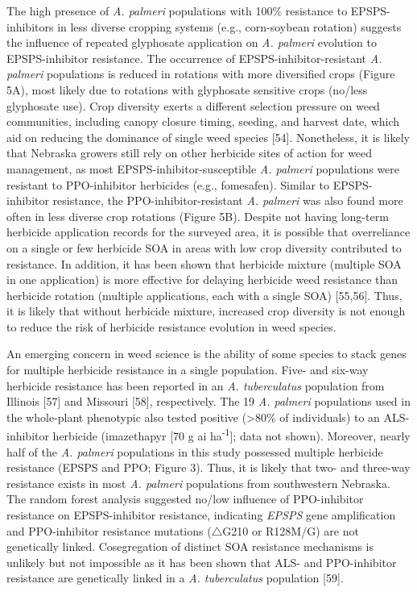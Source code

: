 \documentclass[10pt,letterpaper]{article}
\begin{document}
The high presence of \emph{A. palmeri} populations with 100\% resistance
to EPSPS-inhibitors in less diverse cropping systems (e.g., corn-soybean
rotation) suggests the influence of repeated glyphosate application on
\emph{A. palmeri} evolution to EPSPS-inhibitor resistance. The
occurrence of EPSPS-inhibitor-resistant \emph{A. palmeri} populations is
reduced in rotations with more diversified crops (Figure 5A), most
likely due to rotations with glyphosate sensitive crops (no/less
glyphosate use). Crop diversity exerts a different selection pressure on
weed communities, including canopy closure timing, seeding, and harvest
date, which aid on reducing the dominance of single weed species
{[}54{]}. Nonetheless, it is likely that Nebraska growers still rely on
other herbicide sites of action for weed management, as most
EPSPS-inhibitor-susceptible \emph{A. palmeri} populations were resistant
to PPO-inhibitor herbicides (e.g., fomesafen). Similar to
EPSPS-inhibitor resistance, the PPO-inhibitor-resistant \emph{A.
palmeri} was also found more often in less diverse crop rotations
(Figure 5B). Despite not having long-term herbicide application records
for the surveyed area, it is possible that overreliance on a single or
few herbicide SOA in areas with low crop diversity contributed to
resistance. In addition, it has been shown that herbicide mixture
(multiple SOA in one application) is more effective for delaying
herbicide weed resistance than herbicide rotation (multiple
applications, each with a single SOA) {[}55,56{]}. Thus, it is likely
that without herbicide mixture, increased crop diversity is not enough
to reduce the risk of herbicide resistance evolution in weed species.

An emerging concern in weed science is the ability of some species to
stack genes for multiple herbicide resistance in a single population.
Five- and six-way herbicide resistance has been reported in an \emph{A.
tuberculatus} population from Illinois {[}57{]} and Missouri {[}58{]},
respectively. The 19 \emph{A. palmeri} populations used in the
whole-plant phenotypic also tested positive (\textgreater80\% of
individuals) to an ALS-inhibitor herbicide (imazethapyr {[}70 g ai
ha\textsuperscript{-1}{]}; data not shown). Moreover, nearly half of the
\emph{A. palmeri} populations in this study possessed multiple herbicide
resistance (EPSPS and PPO; Figure 3). Thus, it is likely that two- and
three-way resistance exists in most \emph{A. palmeri} populations from
southwestern Nebraska. The random forest analysis suggested no/low
influence of PPO-inhibitor resistance on EPSPS-inhibitor resistance,
indicating \emph{EPSPS} gene amplification and PPO-inhibitor resistance
mutations (\(\triangle\)G210 or R128M/G) are not genetically linked.
Cosegregation of distinct SOA resistance mechanisms is unlikely but not
impossible as it has been shown that ALS- and PPO-inhibitor resistance
are genetically linked in a \emph{A. tuberculatus} population {[}59{]}.
\end{document}
